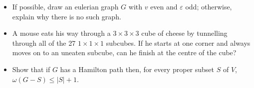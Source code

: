 \documentclass[11pt]{article}
\newcommand\itm[1]{\item[\textbf{#1}]}
\begin{document}
\begin{itemize}
  \itm{4.1.2} If possible, draw an eulerian graph \(G\) with \(v\) even and \(\varepsilon\) odd; otherwise, explain why there is no such graph.

  \itm{4.2.2} A mouse eats his way through a \(3 \times 3 \times 3\) cube of cheese by tunnelling through all of the 27 \(1 \times 1 \times 1\) subcubes.  If he starts at one corner and always moves on to an uneaten subcube, can he finish at the centre of the cube?

  \itm{4.2.3} Show that if \(G\) has a Hamilton path then, for every proper subset \(S\) of \(V\), \(\omega(G-S) \leq |S|+1\).

\end{itemize}
\end{document}

